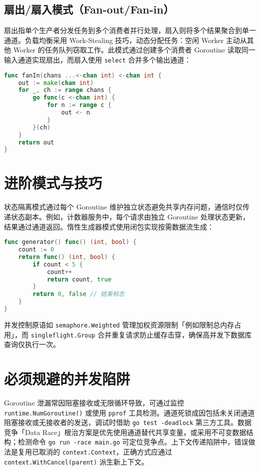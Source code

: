 \section{扇出/扇入模式（Fan-out/Fan-in）}
扇出指单个生产者分发任务到多个消费者并行处理，扇入则将多个结果聚合到单一通道。负载均衡采用 Work-Stealing 技巧，动态分配任务：空闲 Worker 主动从其他 Worker 的任务队列窃取工作。此模式通过创建多个消费者 Goroutine 读取同一输入通道实现扇出，而扇入使用 \texttt{select} 合并多个输出通道：\par
\begin{lstlisting}[language=go]
func fanIn(chans ...<-chan int) <-chan int {
    out := make(chan int)
    for _, ch := range chans {
        go func(c <-chan int) {
            for n := range c {
                out <- n
            }
        }(ch)
    }
    return out
}
\end{lstlisting}
\chapter{进阶模式与技巧}
状态隔离模式通过每个 Goroutine 维护独立状态避免共享内存问题，通信时仅传递状态副本。例如，计数器服务中，每个请求由独立 Goroutine 处理状态更新，结果通过通道返回。惰性生成器模式使用闭包实现按需数据流生成：\par
\begin{lstlisting}[language=go]
func generator() func() (int, bool) {
    count := 0
    return func() (int, bool) {
        if count < 5 {
            count++
            return count, true
        }
        return 0, false // 结束标志
    }
}
\end{lstlisting}
并发控制原语如 \texttt{semaphore.Weighted} 管理加权资源限制「例如限制总内存占用」，而 \texttt{singleflight.Group} 合并重复请求防止缓存击穿，确保高并发下数据库查询仅执行一次。\par
\chapter{必须规避的并发陷阱}
Goroutine 泄漏常因阻塞接收或无限循环导致，可通过监控 \texttt{runtime.NumGoroutine()} 或使用 \texttt{pprof} 工具检测。通道死锁成因包括未关闭通道阻塞接收或无接收者的发送，调试时借助 \texttt{go test -deadlock} 第三方工具。数据竞争「Data Race」根治方案是优先使用通道替代共享变量，或采用不可变数据结构；检测命令 \texttt{go run -race main.go} 可定位竞争点。上下文传递陷阱中，错误做法是复用已取消的 \texttt{context.Context}，正确方式应通过 \texttt{context.WithCancel(parent)} 派生新上下文。\par
